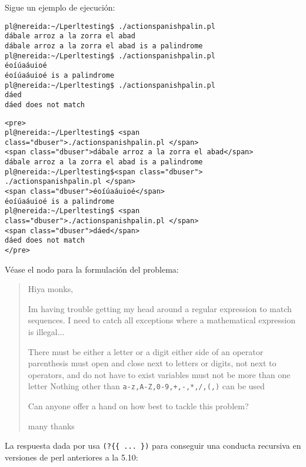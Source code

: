 Sigue un ejemplo de ejecución:

\begin{latexonly}
\begin{verbatim}
pl@nereida:~/Lperltesting$ ./actionspanishpalin.pl 
dábale arroz a la zorra el abad
dábale arroz a la zorra el abad is a palindrome
pl@nereida:~/Lperltesting$ ./actionspanishpalin.pl 
éoíúaáuioé
éoíúaáuioé is a palindrome
pl@nereida:~/Lperltesting$ ./actionspanishpalin.pl 
dáed
dáed does not match
\end{verbatim}
\end{latexonly}
\begin{verbatim}
<pre>
pl@nereida:~/Lperltesting$ <span class="dbuser">./actionspanishpalin.pl </span>
<span class="dbuser">dábale arroz a la zorra el abad</span>
dábale arroz a la zorra el abad is a palindrome
pl@nereida:~/Lperltesting$<span class="dbuser"> ./actionspanishpalin.pl </span>
<span class="dbuser">éoíúaáuioé</span>
éoíúaáuioé is a palindrome
pl@nereida:~/Lperltesting$ <span class="dbuser">./actionspanishpalin.pl </span>
<span class="dbuser">dáed</span>
dáed does not match
</pre>
\end{verbatim}



Véase el nodo 
para la formulación del problema:

\begin{it}\begin{quotation} 
Hiya monks,

Im having trouble getting my head around a regular expression to match sequences.
I need to catch all exceptions where a mathematical expression is illegal...

There must be either a letter or a digit either side of an operator
parenthesis must open and close next to letters or digits, not next to operators, and do not have to exist
variables must not be more than one letter
Nothing other than \verb|a-z,A-Z,0-9,+,-,*,/,(,)| can be used

Can anyone offer a hand on how best to tackle this problem?

many thanks 
\end{quotation}\end{it} 

La respuesta dada por  usa \verb|(?{{ ... })|
para conseguir una conducta recursiva en versiones de perl anteriores a la 5.10:

